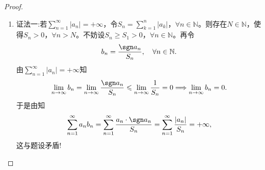 \documentclass[../../main.tex]{subfiles}%
\begin{document}
\begin{proof}
\begin{enumerate}[(1)]
\item {\color{blue}证法一:}若$\sum\limits_{n=1}^{\infty} |a_n| = +\infty$，令$S_n = \sum\limits_{k=1}^{n} |a_k|$，$\forall n\in \mathbb{N}$。则存在$N\in \mathbb{N}$，使得$S_n > 0$，$\forall n > N$。不妨设$S_n \geqslant S_1 > 0$，$\forall n\in \mathbb{N}$。再令
\begin{align*}
b_n = \frac{\sgn a_n}{S_n},\quad \forall n\in \mathbb{N}.
\end{align*}
由$\sum\limits_{n=1}^{\infty} |a_n| = +\infty$知
\begin{align*}
\lim\limits_{n\to\infty} b_n = \lim\limits_{n\to\infty} \frac{\sgn a_n}{S_n} \leqslant \lim\limits_{n\to\infty} \frac{1}{S_n} = 0 \Longrightarrow \lim\limits_{n\to\infty} b_n = 0.
\end{align*}
于是由知
\begin{align*}
\sum\limits_{n=1}^{\infty} a_n b_n = \sum\limits_{n=1}^{\infty} \frac{a_n\cdot \sgn a_n}{S_n} = \sum\limits_{n=1}^{\infty} \frac{|a_n|}{S_n} = +\infty,
\end{align*}
这与题设矛盾!


\end{enumerate}
\end{proof}
\end{document}
